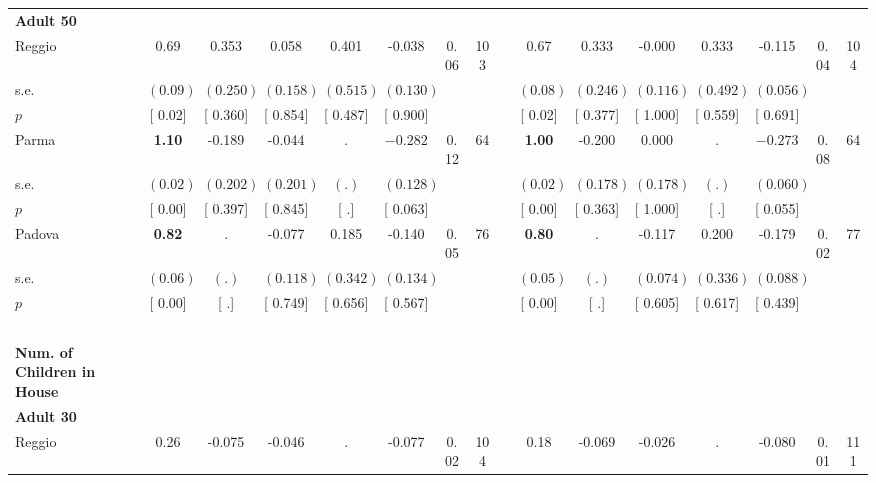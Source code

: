 \begin{longtable}{L{8em} c c c c c c c p{1em} c c c c c c c}
\quad \quad \textbf{Adult 50} & & & & & & & & & & & & & & & \\* 
\quad \quad \quad Reggio& 0.69 &     0.353 &     0.058 &     0.401 &    -0.038 &      0.06 &       103 & & 0.67 &     0.333 &    -0.000 &     0.333 &    -0.115 &      0.04 &       104  \\*
\quad \quad \quad \quad s.e.& $ (     0.09)$ & $ (    0.250)$ & $ (    0.158)$ & $ (    0.515)$ & $ (    0.130)$ & & & & $ (     0.08)$ & $ (    0.246)$ & $ (    0.116)$ & $ (    0.492)$ & $ (    0.056)$ & &  \\*
\quad \quad \quad \quad $ p$ & [     0.02] & [    0.360] & [    0.854] & [    0.487] & [    0.900] & & & & [     0.02] & [    0.377] & [    1.000] & [    0.559] & [    0.691] & &  \\[1em]
\quad \quad \quad Parma& \textbf{     1.10} &    -0.189 &    -0.044 &         . & $ \mathbf{   -0.282}$ &      0.12 &        64 & & \textbf{     1.00} &    -0.200 &     0.000 &         . & $ \mathbf{   -0.273}$ &      0.08 &        64  \\*
\quad \quad \quad \quad s.e.& $ (     0.02)$ & $ (    0.202)$ & $ (    0.201)$ & $ (        .)$ & $ (    0.128)$ & & & & $ (     0.02)$ & $ (    0.178)$ & $ (    0.178)$ & $ (        .)$ & $ (    0.060)$ & &  \\*
\quad \quad \quad \quad $ p$ & [     0.00] & [    0.397] & [    0.845] & [        .] & [    0.063] & & & & [     0.00] & [    0.363] & [    1.000] & [        .] & [    0.055] & &  \\[1em]
\quad \quad \quad Padova& \textbf{     0.82} &         . &    -0.077 &     0.185 &    -0.140 &      0.05 &        76 & & \textbf{     0.80} &         . &    -0.117 &     0.200 &    -0.179 &      0.02 &        77  \\*
\quad \quad \quad \quad s.e.& $ (     0.06)$ & $ (        .)$ & $ (    0.118)$ & $ (    0.342)$ & $ (    0.134)$ & & & & $ (     0.05)$ & $ (        .)$ & $ (    0.074)$ & $ (    0.336)$ & $ (    0.088)$ & &  \\*
\quad \quad \quad \quad $ p$ & [     0.00] & [        .] & [    0.749] & [    0.656] & [    0.567] & & & & [     0.00] & [        .] & [    0.605] & [    0.617] & [    0.439] & &  \\[1em]
~\\[1em]
\textbf{Num. of Children in House} \\*
\quad \quad \textbf{Adult 30} & & & & & & & & & & & & & & & \\* 
\quad \quad \quad Reggio& 0.26 &    -0.075 &    -0.046 &         . &    -0.077 &      0.02 &       104 & & 0.18 &    -0.069 &    -0.026 &         . &    -0.080 &      0.01 &       111  \\*

\end{longtable}
